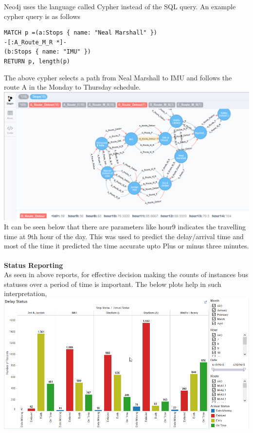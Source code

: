 \documentclass[12pt]{article}\usepackage[]{graphicx}\usepackage[]{color}
\begin{document}
Neo4j uses the language called Cypher instead of the SQL query. An example cypher query is as follows\\
\begin{verbatim}
MATCH p =(a:Stops { name: "Neal Marshall" })
-[:A_Route_M_R *]-
(b:Stops { name: "IMU" })
RETURN p, length(p)
\end{verbatim}
The above cypher selects a path from Neal Marshall to IMU and follows the route A in the Monday to Thursday schedule.\\
\includegraphics[scale=0.45]{resources/neo4j3}\\[1cm] 
It can be seen below that there are parameters like hour9 indicates the travelling time at 9th hour of the day. This was used to predict the delay/arrival time and most of the time it predicted the time accurate upto Plus or minus three minutes.\\ \\
\textbf{Status Reporting} \\
As seen in above reports, for effective decision making the counts of instances bus statuses over a period of time is important. The below plots help in such interpretation,\\
\includegraphics[scale=0.55]{resources/tableau1}\\[1cm] 
\end{document}
